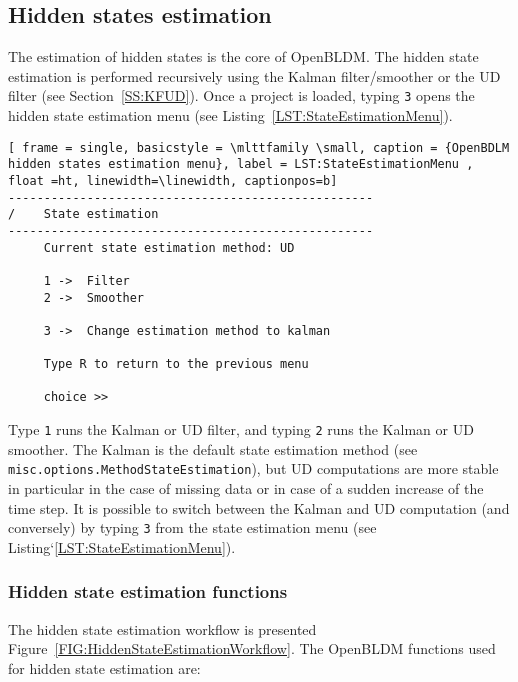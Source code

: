 \subsection{Hidden states estimation}
\label{S:HIDDENSTATESESTIMATION}

The estimation of hidden states is the core of OpenBLDM.
The hidden state estimation is performed recursively using the Kalman filter/smoother or the UD filter (see Section~\ref{SS:KFUD}).
Once a project is loaded, typing \colorbox{light-gray}{\lstinline[basicstyle = \mlttfamily \small ]!3!} opens the hidden state estimation menu (see Listing~\ref{LST:StateEstimationMenu}).

\begin{lstlisting}[ frame = single, basicstyle = \mlttfamily \small, caption = {OpenBDLM hidden states estimation menu}, label = LST:StateEstimationMenu ,  float =ht, linewidth=\linewidth, captionpos=b]
---------------------------------------------------
/    State estimation
---------------------------------------------------
     Current state estimation method: UD

     1 ->  Filter 
     2 ->  Smoother 

     3 ->  Change estimation method to kalman 

     Type R to return to the previous menu 

     choice >> 
\end{lstlisting}

Type  \colorbox{light-gray}{\lstinline[basicstyle = \mlttfamily \small ]!1!} runs the Kalman or UD filter, and typing \colorbox{light-gray}{\lstinline[basicstyle = \mlttfamily \small ]!2!} runs the Kalman or UD smoother.
The Kalman is the default state estimation method (see \lstinline[basicstyle = \mlttfamily \small ]!misc.options.MethodStateEstimation!), but UD computations are more stable in particular in the case of missing data or in case of a sudden increase of the time step.
It is possible to switch between the Kalman and UD computation (and conversely) by typing \colorbox{light-gray}{\lstinline[basicstyle = \mlttfamily \small ]!3!} from the state estimation menu (see Listing`\ref{LST:StateEstimationMenu}).

\subsubsection{Hidden state estimation functions}

The hidden state estimation workflow is presented Figure~\ref{FIG:HiddenStateEstimationWorkflow}.
The OpenBLDM functions used for hidden state estimation are:

